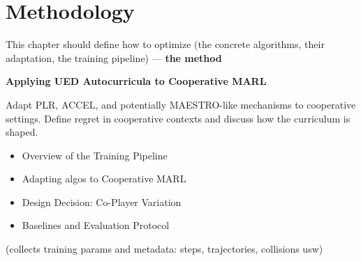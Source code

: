 \chapter{Methodology} \label{sec: Methodology}

This chapter should define how to optimize (the concrete algorithms, their adaptation, the training pipeline) — \textbf{the method}

\textbf{Applying UED Autocurricula to Cooperative MARL}

Adapt PLR, ACCEL, and potentially MAESTRO-like mechanisms to cooperative settings. Define regret in cooperative contexts and discuss how the curriculum is shaped.

\begin{itemize}
    \item Overview of the Training Pipeline
    \item Adapting algos to Cooperative MARL
    \item Design Decision: Co-Player Variation
    \item Baselines and Evaluation Protocol
\end{itemize}

(collects training params and metadata: steps, trajectories, collisions usw)


